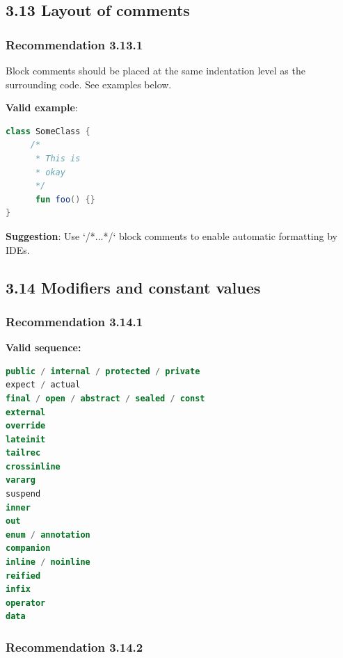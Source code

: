 {{{{\subsection*{\textbf{3.13 Layout of comments}}

\subsubsection*{\textbf{Recommendation 3.13.1}}
\leavevmode\newline



Block comments should be placed at the same indentation level as the surrounding code. See examples below.



\textbf{Valid example}:



\begin{lstlisting}[language=Kotlin]
class SomeClass {
     /*
      * This is
      * okay
      */
      fun foo() {}
}
\end{lstlisting}


\textbf{Suggestion}: Use `/*...*/` block comments to enable automatic formatting by IDEs.



\subsection*{\textbf{3.14 Modifiers and constant values}}

\subsubsection*{\textbf{Recommendation 3.14.1}}
\leavevmode\newline

\textbf{Valid sequence:}



\begin{lstlisting}[language=Kotlin]
public / internal / protected / private
expect / actual
final / open / abstract / sealed / const
external
override
lateinit
tailrec
crossinline
vararg
suspend
inner
out
enum / annotation
companion
inline / noinline
reified
infix
operator
data
\end{lstlisting}


\subsubsection*{\textbf{Recommendation 3.14.2}}
\leavevmode\newline

}}}}
